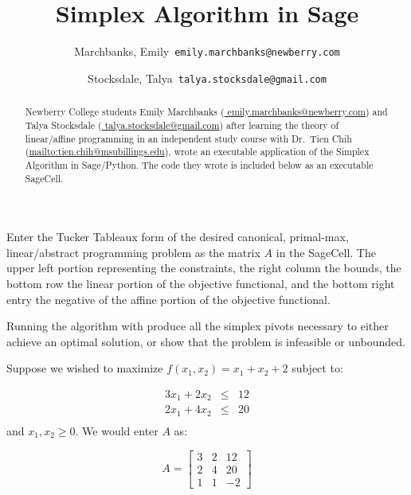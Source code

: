 \documentclass{ximera}
\title{Simplex Algorithm in Sage}
\author{
  Marchbanks, Emily\      \texttt{emily.marchbanks@newberry.com}
  \and
  Stocksdale, Talya\      \texttt{talya.stocksdale@gmail.com}
}
\begin{document}
      
\begin{abstract}
Newberry College students Emily Marchbanks {\normalfont(\href{mailto:emily.marchbanks@newberry.com}{{ emily.marchbanks@newberry.com}})  } and Talya Stocksdale {\normalfont(\href{mailto:talya.stocksdale@gmail.com}{ talya.stocksdale@gmail.com})} after learning the theory of linear/affine programming in an independent study course with Dr.\ Tien Chih {\normalfont(\href{mailto:tien.chih@msubillings.edu}{mailto:tien.chih@msubillings.edu})}, wrote an executable application of the Simplex Algorithm in Sage/Python.  The code they wrote is included below as an executable SageCell.
\end{abstract}
      
\maketitle

Enter the Tucker Tableaux form of the desired canonical, primal-max, linear/abstract programming problem as the matrix $A$ in the SageCell.  The upper left portion representing the constraints, the right column the bounds, the bottom row the linear portion of the objective functional, and the bottom right entry the negative of the affine portion of the objective functional.

Running the algorithm with produce all the simplex pivots necessary to either achieve an optimal solution, or show that the problem is infeasible or unbounded.

\begin{example}
Suppose we wished to maximize $f(x_1, x_2)=x_1+x_2+2$ subject to:

\begin{eqnarray*}
3x_1+2x_2&\leq&12\\
2x_1+4x_2&\leq&20\\
\end{eqnarray*}
and $x_1, x_2\geq 0$.  We would enter $A$ as:

$$A=\begin{bmatrix} 3&2&12\\ 2&4&20\\1&1&-2\end{bmatrix}$$
 
 \end{example}
 
\end{document}
